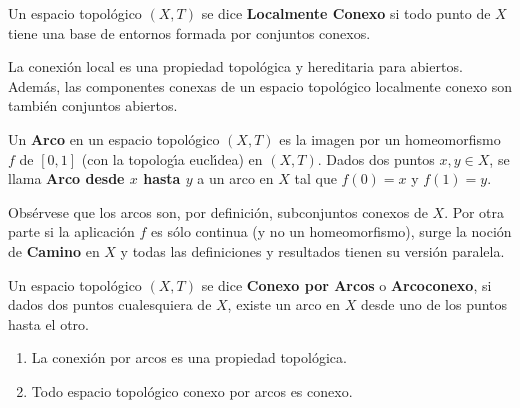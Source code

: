 \documentclass[cursovd_portada.tex]{subfiles}
\begin{document}
\begin{defi}
Un espacio topol\'{o}gico $(X,T)$ se dice {\bf Localmente Conexo} si todo punto de $X$ tiene una base de entornos
formada por conjuntos conexos.
\end{defi}
\begin{prop}
La conexi\'{o}n local es una propiedad topol\'{o}gica y hereditaria para abiertos. Adem\'{a}s, las componentes conexas de un
espacio topol\'{o}gico localmente conexo son tambi\'{e}n conjuntos abiertos.
\end{prop}
\begin{defi}
Un {\bf Arco} en un espacio topol\'{o}gico $(X,T)$ es la imagen por un homeomorfismo $f$ de $[0,1]$ (con la topolog\'{\i}a
eucl\'{\i}dea) en $(X,T)$. Dados dos puntos $x,y\in X$, se llama {\bf Arco desde $x$ hasta $y$} a un arco en $X$ tal
que $f(0)=x$ y $f(1)=y$.
\end{defi}
\begin{nota}
{\rm Obs\'{e}rvese que los arcos son, por definici\'{o}n, subconjuntos conexos de $X$. Por otra parte si la aplicaci\'{o}n $f$
es s\'{o}lo continua (y no un homeomorfismo), surge la noci\'{o}n de {\bf Camino} en $X$ y todas las definiciones y
resultados tienen su versi\'{o}n paralela.}
\end{nota}
\begin{defi}
Un espacio topol\'{o}gico $(X,T)$ se dice {\bf Conexo por Arcos} o {\bf Arcoconexo}, si dados dos puntos cualesquiera
de $X$, existe un arco en $X$ desde uno de los puntos hasta el otro.
\end{defi}
\begin{prop}
\begin{enumerate}
\item La conexi\'{o}n por arcos es una propiedad topol\'{o}gica.
\item Todo espacio topol\'{o}gico conexo por arcos es conexo.
\end{enumerate}
\end{prop}
\end{document}

